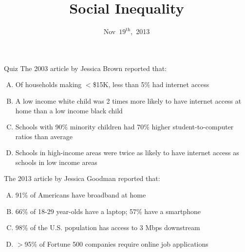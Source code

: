 \documentclass{beamer}
\title{Social Inequality}
\date{Nov~$19^{\text{th}}$,~2013}
\begin{document}
\begin{frame}
\titlepage
\end{frame}

\begin{frame}{Quiz}
The 2003 article by Jessica Brown reported that:
\begin{enumerate}[(A)]
\item<1> Of households making $<$\$15K, less than 5\% had internet access %
\item<1> A low income white child was 2 times more likely to have internet access at home than a low income black child %
\item<1-2> Schools with 90\% minority children had 70\% higher student-to-computer ratios than average %
\item<1> Schools in high-income areas were twice as likely to have internet access as schools in low income areas %
\end{enumerate}
\bigskip
The 2013 article by Jessica Goodman reported that:
\begin{enumerate}[(A)]
\item<1> 91\% of Americans have broadband at home %
\item<1> 66\% of 18-29 year-olds have a laptop; 57\% have a smartphone %
\item<1-2> 98\% of the U.S. population has access to 3 Mbps downstream
\item<1> $>$95\% of Fortune 500 companies require online job applications %
\end{enumerate}
\end{frame}



\end{document}
